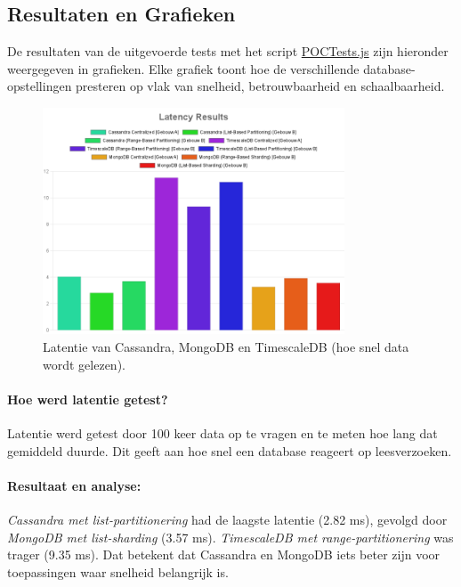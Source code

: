 \subsection{Resultaten en Grafieken}
De resultaten van de uitgevoerde tests met het script \href{https://github.com/WoutVC/bachelorproef2024/blob/main/proof_of_concept/POCTests.js}{POCTests.js} zijn hieronder weergegeven in grafieken. Elke grafiek toont hoe de verschillende database-opstellingen presteren op vlak van snelheid, betrouwbaarheid en schaalbaarheid.

\begin{figure}[H]
	\centering
	\includegraphics[width=0.8\textwidth]{Latency.png}
	\caption{Latentie van Cassandra, MongoDB en TimescaleDB (hoe snel data wordt gelezen).}
	\label{fig:latency-comparison}
\end{figure}

\paragraph{Hoe werd latentie getest?}
Latentie werd getest door 100 keer data op te vragen en te meten hoe lang dat gemiddeld duurde. Dit geeft aan hoe snel een database reageert op leesverzoeken.

\paragraph{Resultaat en analyse:}
\textit{Cassandra met list-partitionering} had de laagste latentie (2.82 ms), gevolgd door \textit{MongoDB met list-sharding} (3.57 ms). \textit{TimescaleDB met range-partitionering} was trager (9.35 ms). Dat betekent dat Cassandra en MongoDB iets beter zijn voor toepassingen waar snelheid belangrijk is.

